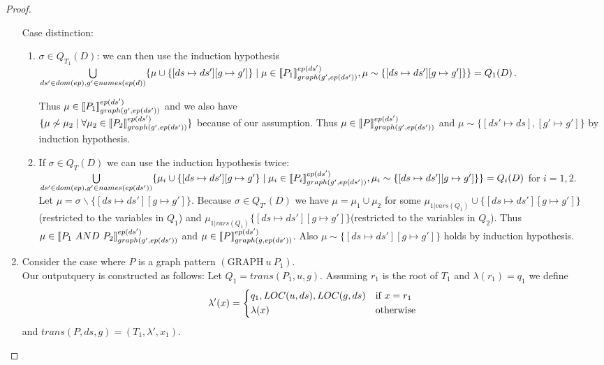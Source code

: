 \begin{proof}
\begin{enumerate}
	Case distinction:
	\begin{enumerate}
		\item $\sigma \in Q_{T_1}(D)$: 
			we can then use the induction hypothesis\\  
			$\bigcup\limits_{ds' \in dom(ep), g' \in names(ep(d))} \{ \mu \cup \{[ds
				\mapsto ds'] [g	\mapsto g']\} \mid \mu
				\in \llbracket P_1 \rrbracket^{ep(ds')}_{graph(g',ep(ds'))}, \mu \sim \{[ds
			\mapsto ds'] [g \mapsto g']\} \}  =	Q_1(D) $. 

			Thus $\mu \in \llbracket P_1 \rrbracket^{ep(ds')}_{graph(g',ep(ds'))}$ 
			and we also have\\ $\{\mu \not\sim \mu_2 \mid \forall \mu_2 \in
			\llbracket P_2 \rrbracket^{ep(ds')}_{graph(g',ep(ds'))} \}$ because of our assumption.
			Thus $\mu \in \llbracket P \rrbracket_{graph(g',ep(ds'))}^{ep(ds')}$ and $\mu \sim
			\{[ds' \mapsto ds],[g'\mapsto g']\}$ by induction hypothesis.

		\item If $\sigma \in Q_{T}(D)$  we can use the induction hypothesis twice:\\
			$\bigcup\limits_{ds' \in dom(ep),g' \in names(ep(ds'))} \{ \mu_i \cup\{[ds
					\mapsto ds'] [g \mapsto g'\}  \mid \\ \mu_i
					\in \llbracket P_i \rrbracket^{ep(ds')}_{graph(g',ep(ds'))}, \mu_i \sim \{[ds
				\mapsto ds'] [g \mapsto g']\}\}  = Q_i(D)$ for $i=1,2$.\\
				Let $\mu = \sigma \backslash \{[ds \mapsto ds'] [g \mapsto g']\}$.
				Because $\sigma \in Q_{T'}(D)$ we have $\mu = \mu_1 \cup \mu_2$ for
				some $\mu_{1|vars(Q_1)}\cup\{[ds \mapsto ds'] [g \mapsto g']\}$(restricted to
			the variables in $Q_1$) and 
			$\mu_{1|vars(Q_1)}\{[ds \mapsto ds'] [g \mapsto g']\}$(restricted to
			the variables in $Q_2$).
				Thus $\mu \in \llbracket P_1 \ AND \ P_2 \rrbracket^{ep(ds')}_{graph(g',ep(ds'))}$
				and $\mu \in \llbracket P \rrbracket^{ep(ds')}_{graph(g,ep(ds'))}$. Also $\mu \sim
				\{[ds \mapsto ds'] [g \mapsto g']\}$ holds by induction
				hypothesis.
		\end{enumerate}

	\item Consider the case where $P$ is a graph pattern $(\mbox{GRAPH} \ u \ P_1)$. \\
		Our outputquery is constructed as follows: Let $Q_1 = trans(P_1,u,g)$. 
		Assuming $r_1$ is the root of $T_1$ and $\lambda(r_1) = q_1$ we define
		\[ \lambda'(x) =\begin{dcases*} 
				q_1, LOC(u,ds),LOC(g,ds)& if $x = r_1$\\
				\lambda(x) & otherwise	\\
			\end{dcases*}
		\] and $trans(P,ds,g) = (T_1,\lambda',x_1)$.
		

\end{enumerate}
\end{proof}
